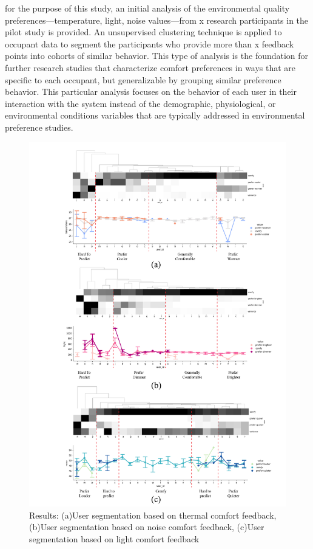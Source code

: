 \documentclass[]{interact}
\theoremstyle{plain}%
\theoremstyle{definition}
\theoremstyle{remark}
\begin{document}
for the purpose of this study, an initial analysis of the environmental quality preferences---temperature, light, noise values---from x research participants in the pilot study is provided. An unsupervised clustering technique is applied to occupant data to segment the participants who provide more than x feedback points into cohorts of similar behavior. This type of analysis is the foundation for further research studies that characterize comfort preferences in ways that are specific to each occupant, but generalizable by grouping similar preference behavior. This particular analysis focuses on the behavior of each user in their interaction with the system instead of the demographic, physiological, or environmental conditions variables that are typically addressed in environmental preference studies. 

\begin{figure}[H]
\centering
\includegraphics[scale=0.7]{figures/results-01.jpg}
\caption{Results: (a)User segmentation based on thermal comfort feedback, (b)User segmentation based on noise comfort feedback, (c)User segmentation based on light comfort feedback} 
\label{results}
\end{figure}
\end{document}
